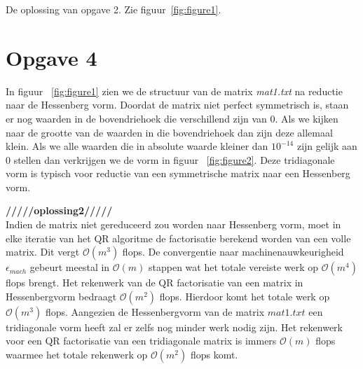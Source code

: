 \documentclass[a4paper]{article}
\newcommand{\opgave}[1]{\section*{Opgave #1}}
\begin{document}
De oplossing van opgave 2. Zie figuur~\ref{fig:figure1}.
\opgave{4}
In figuur ~\ref{fig:figure1} zien we de structuur van de matrix \textit{mat1.txt} na reductie naar de Hessenberg vorm. Doordat de matrix niet perfect symmetrisch is, staan er nog waarden in de bovendriehoek die verschillend zijn van 0. Als we kijken naar de grootte van de waarden in die bovendriehoek dan zijn deze allemaal klein. Als we alle waarden die in absolute waarde kleiner dan $10^{-14}$ zijn gelijk aan 0 stellen dan verkrijgen we de vorm in figuur ~\ref{fig:figure2}. Deze tridiagonale vorm is typisch voor reductie van een symmetrische matrix naar een Hessenberg vorm.

\textbf{/////oplossing2/////}\\
Indien de matrix niet gereduceerd zou worden naar Hessenberg vorm, moet in elke iteratie van het QR algoritme de factorisatie berekend worden van een volle matrix. Dit vergt $\mathcal{O}(m^{3})$ flops. De convergentie naar machinenauwkeurigheid $\epsilon _{mach}$ gebeurt meestal in $\mathcal{O}(m)$ stappen wat het totale vereiste werk op $\mathcal{O}(m^{4})$ flops brengt. Het rekenwerk van de QR factorisatie van een matrix in Hessenbergvorm bedraagt $\mathcal{O}(m^{2})$ flops. Hierdoor komt het totale werk op $\mathcal{O}(m^{3})$ flops. Aangezien de Hessenbergvorm van de matrix $mat1.txt$ een tridiagonale vorm heeft zal er zelfs nog minder werk nodig zijn. Het rekenwerk voor een QR factorisatie van een tridiagonale matrix is immers $\mathcal{O}(m)$ flops waarmee het totale rekenwerk op $\mathcal{O}(m^{2})$ flops komt.
\end{document}
